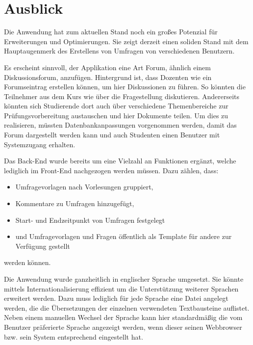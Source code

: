 \section{Ausblick}
\label{sec:Ausblick}

Die Anwendung hat zum aktuellen Stand noch ein großes Potenzial für Erweiterungen und Optimierungen.
Sie zeigt derzeit einen soliden Stand mit dem Hauptaugenmerk des Erstellens von Umfragen von verschiedenen Benutzern.

Es erscheint sinnvoll, der Applikation eine Art Forum, ähnlich einem Diskussionsforum, anzufügen.
Hintergrund ist, dass \zb Dozenten wie \dutzi ein Forumseintrag erstellen können, um hier Diskussionen zu führen.
So könnten die Teilnehmer aus dem Kurs wie \weigert über die Fragestellung diskutieren.
Andererseits könnten sich Studierende dort auch über verschiedene Themenbereiche zur Prüfungsvorbereitung austauschen und hier Dokumente teilen. \newline
Um dies zu realisieren, müssten Datenbankanpassungen vorgenommen werden, damit das Forum dargestellt werden kann und auch Studenten einen Benutzer mit Systemzugang erhalten.

Das Back-End wurde bereits um eine Vielzahl an Funktionen ergänzt, welche lediglich im Front-End nachgezogen werden müssen.
Dazu zählen, dass:
% 
\begin{itemize}
    \item Umfragevorlagen \zb nach Vorlesungen gruppiert,
    \item Kommentare zu Umfragen hinzugefügt, 
    \item Start- und Endzeitpunkt von Umfragen festgelegt
    \item und Umfragevorlagen und Fragen öffentlich als Template für andere zur Verfügung gestellt
\end{itemize}
% 
werden können.

Die Anwendung wurde ganzheitlich in englischer Sprache umgesetzt.
Sie könnte mittels Internationalisierung effizient um die Unterstützung weiterer Sprachen erweitert werden.
Dazu muss lediglich für jede Sprache eine Datei angelegt werden, die die Übersetzungen der einzelnen verwendeten Textbausteine auflistet.
Neben einem manuellen Wechsel der Sprache kann hier standardmäßig die vom Benutzer präferierte Sprache angezeigt werden, wenn dieser seinen Webbrowser bzw. sein System entsprechend eingestellt hat.

